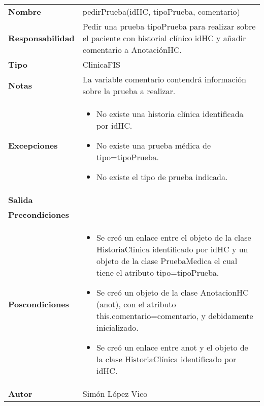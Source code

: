 \documentclass[11pt,a4paper]{article}
\begin{document}
\begin{table}[H]
	\centering
	\label{my-label}
	\begin{tabularx}{\textwidth}{l|X}
		\textbf{Nombre}          & pedirPrueba(idHC, tipoPrueba, comentario) \\
		\textbf{Responsabilidad} & Pedir una prueba tipoPrueba para realizar sobre el paciente con historial clínico idHC y añadir comentario a AnotaciónHC.\\
		\textbf{Tipo}            & ClinicaFIS \\
		\textbf{Notas}           & La variable comentario contendrá información sobre la prueba a realizar. \\
		\textbf{Excepciones}     &
		\begin{itemize}
			\item No existe una historia clínica identificada por idHC.
			\item No existe una prueba médica de tipo=tipoPrueba.
			\item No existe el tipo de prueba indicada.
		\end{itemize} \\
		\textbf{Salida}          &  \\
		\textbf{Precondiciones}  &  \\
		\textbf{Poscondiciones}  &
		\begin{itemize}
			\item Se creó un enlace entre el objeto de la clase HistoriaClinica identificado por idHC y un objeto de la clase PruebaMedica el cual tiene el atributo tipo=tipoPrueba.
			\item Se creó un objeto de la clase AnotacionHC (anot), con el atributo this.comentario=comentario, y debidamente inicializado.
			\item Se creó un enlace entre anot y el objeto de la clase HistoriaClínica identificado por idHC.
		\end{itemize} \\
		\textbf{Autor}			 & Simón López Vico 
	\end{tabularx}
\end{table}
\end{document}
